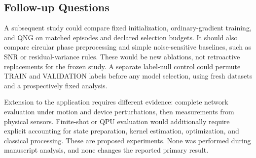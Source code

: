 \subsection{Follow-up Questions}
\label{sec:discussion-future}

A subsequent study could compare fixed initialization, ordinary-gradient training, and QNG on matched episodes and declared selection budgets. It should also compare circular phase preprocessing and simple noise-sensitive baselines, such as SNR or residual-variance rules. These would be new ablations, not retroactive replacements for the frozen study. A separate label-null control could permute TRAIN and VALIDATION labels before any model selection, using fresh datasets and a prospectively fixed analysis.

Extension to the application requires different evidence: complete network evaluation under motion and device perturbations, then measurements from physical sensors. Finite-shot or QPU evaluation would additionally require explicit accounting for state preparation, kernel estimation, optimization, and classical processing. These are proposed experiments. None was performed during manuscript analysis, and none changes the reported primary result.

